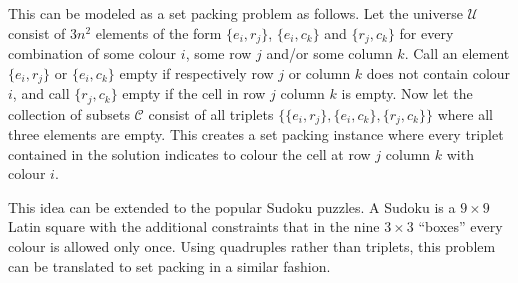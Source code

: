 This can be modeled as a set packing problem as follows. Let the universe $\mathcal{U}$ consist of $3n^2$ elements of the form $\{e_i, r_j\}$, $\{e_i, c_k\}$ and $\{r_j, c_k\}$ for every combination of some colour $i$, some row $j$ and/or some column $k$. Call an element $\{e_i, r_j\}$ or $\{e_i, c_k\}$ empty if respectively row $j$ or column $k$ does not contain colour $i$, and call $\{r_j, c_k\}$ empty if the cell in row $j$ column $k$ is empty. Now let the collection of subsets $\mathcal{C}$ consist of all triplets $\{\{e_i, r_j\}, \{e_i, c_k\}, \{r_j, c_k\}\}$ where all three elements are empty. This creates a set packing instance where every triplet contained in the solution indicates to colour the cell at row $j$ column $k$ with colour $i$. %

This idea can be extended to the popular Sudoku puzzles. A Sudoku is a $9 \times 9$ Latin square with the additional constraints that in the nine $3 \times 3$ ``boxes'' every colour is allowed only once. Using quadruples rather than triplets, this problem can be translated to set packing in a similar fashion.


